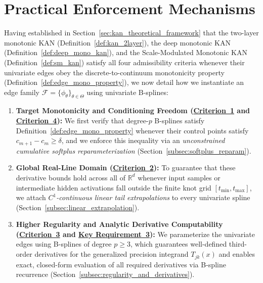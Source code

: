 \documentclass[11pt,a4paper]{article}
\theoremstyle{plain}
\theoremstyle{definition}
\theoremstyle{remark}
\begin{document}
\section{Practical Enforcement Mechanisms}
\label{sec:practical_enforcement}

Having established in Section~\ref{sec:kan_theoretical_framework} that the two-layer monotonic KAN (Definition~\ref{def:kan_2layer}), the deep monotonic KAN (Definition~\ref{def:deep_mono_kan}), and the Scale-Modulated Monotonic KAN (Definition~\ref{def:sm_kan}) satisfy all four admissibility criteria whenever their univariate edges obey the discrete-to-continuum monotonicity property (Definition~\ref{def:edge_mono_property}), we now detail how we instantiate an edge family $\mathcal{F} = \{\phi_\theta\}_{\theta \in \Theta}$ using univariate B-splines:
\begin{enumerate}
    \item \textbf{Target Monotonicity and Conditioning Freedom (\hyperref[crit:target_monotonicity]{Criterion~1} and \hyperref[crit:conditioning_freedom]{Criterion~4}):} We first verify that degree-$p$ B-splines satisfy Definition~\ref{def:edge_mono_property} whenever their control points satisfy $c_{m+1} - c_m \ge \delta$, and we enforce this inequality via an \emph{unconstrained cumulative softplus reparameterization} (Section~\ref{subsec:softplus_reparam}).
    \item \textbf{Global Real-Line Domain (\hyperref[crit:global_domain]{Criterion~2}):} To guarantee that these derivative bounds hold across all of $\mathbb{R}^d$ whenever input samples or intermediate hidden activations fall outside the finite knot grid $[t_{\min}, t_{\max}]$, we attach \emph{$C^1$-continuous linear tail extrapolations} to every univariate spline (Section~\ref{subsec:linear_extrapolation}).
    \item \textbf{Higher Regularity and Analytic Derivative Computability (\hyperref[crit:c3_smoothness]{Criterion~3} and \hyperref[req:key_requirement_3]{Key Requirement~3}):} We parameterize the univariate edges using B-splines of degree $p \ge 3$, which guarantees well-defined third-order derivatives for the generalized precision integrand $T_{jk}(x)$ and enables exact, closed-form evaluation of all required derivatives via B-spline recurrence (Section~\ref{subsec:regularity_and_derivatives}).
\end{enumerate}
\end{document}
